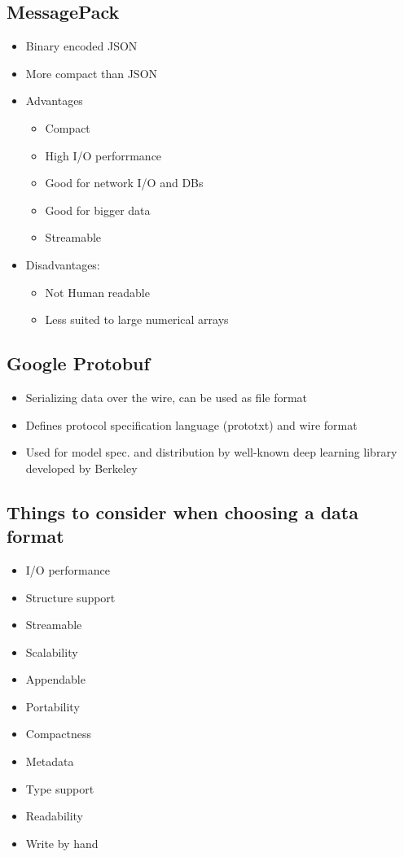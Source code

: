 \documentclass[a4paper]{article}
\begin{document}
\subsection{MessagePack}
\begin{itemize}
	\item  Binary encoded JSON
	\item More compact than JSON
	\item Advantages
	\begin{itemize}
		\item Compact
		\item High I/O perforrmance
		\item Good for network I/O and DBs
		\item Good for bigger data
		\item Streamable
	\end{itemize}
	\item Disadvantages:
	\begin{itemize}
		\item Not Human readable
		\item Less suited to large numerical arrays
	\end{itemize}
\end{itemize}
\subsection{Google Protobuf}
\begin{itemize}
	\item Serializing data over the wire, can be used as file format
	\item Defines protocol specification language (prototxt) and wire format
	\item Used for model spec. and distribution by well-known deep learning
		library developed by Berkeley
\end{itemize}
\subsection{Things to consider when choosing a data format}
\begin{itemize}
	\item I/O performance
	\item Structure support
	\item Streamable
	\item Scalability
	\item Appendable
	\item Portability
	\item Compactness
	\item Metadata
	\item Type support
	\item Readability
	\item Write by hand
\end{itemize}
\end{document}
